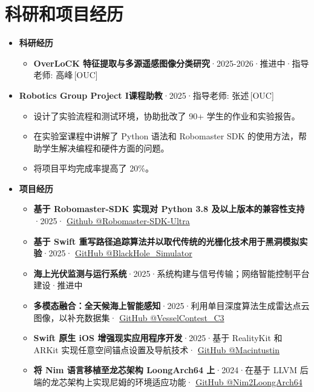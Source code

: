 \documentclass{resume}
\begin{document}
\section{科研和项目经历}\vspace{0.5em}
\begin{itemize}
  \item \textbf{科研经历}
  \begin{itemize}
    \item \textbf{OverLoCK 特征提取与多源遥感图像分类研究}·2025-2026·推进中·指导老师: 高峰\,[OUC]
  \end{itemize}

  \item \textbf{Robotics Group Project I\;课程助教}·2025·指导老师: 张述\,[OUC]
  \begin{itemize}
    \item 设计了实验流程和测试环境，协助批改了 90+ 学生的作业和实验报告。
    \item 在实验室课程中讲解了 Python 语法和 Robomaster SDK 的使用方法，帮助学生解决编程和硬件方面的问题。
    \item 将项目平均完成率提高了 20\%。
  \end{itemize}
  
  \item \textbf{项目经历}
  \begin{itemize}
    \item \textbf{基于 Robomaster-SDK 实现对 Python 3.8 及以上版本的兼容性支持}·2025· \href{https://github.com/RamessesN/Robomaster-SDK-Ultra}{Github @Robomaster-SDK-Ultra}
    \item \textbf{基于 Swift 重写路径追踪算法并以取代传统的光栅化技术用于黑洞模拟实验}·2025· \href{https://github.com/RamessesN/Black_Hole_Simulator}{GitHub @BlackHole\_Simulator}
    \item \textbf{海上光伏监测与运行系统}·2025·系统构建与信号传输；网络智能控制平台建设·推进中
    \item \textbf{多模态融合：全天候海上智能感知}·2025·利用单目深度算法生成雷达点云图像，以补充数据集· \href{https://github.com/RamessesN/VesselContest_C3}{GitHub @VesselContest\_C3}
    \item \textbf{Swift 原生 iOS 增强现实应用程序开发}·2025·基于 RealityKit 和 ARKit 实现任意空间锚点设置及导航技术· \href{https://github.com/RamessesN/Macintustin}{GitHub @Macintustin}
    \item \textbf{将 Nim 语言移植至龙芯架构 LoongArch64 上}·2024·在基于 LLVM 后端的龙芯架构上实现尼姆的环境适应功能· \href{https://github.com/RamessesN/Nim2LoongArch64}{GitHub @Nim2LoongArch64}
  \end{itemize}
\end{itemize}
\end{document}
